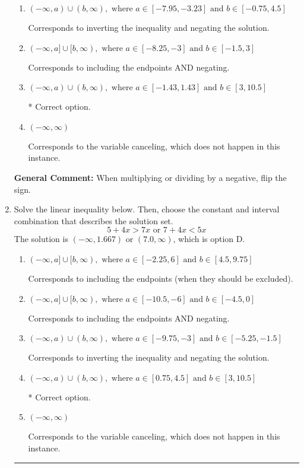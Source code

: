 \documentclass{extbook}[14pt]
\newcommand{\litem}[1]{\item #1

\rule{\textwidth}{0.4pt}}
\begin{document}
\begin{enumerate}
{\begin{enumerate}[label=\Alph*.]
Corresponds to including the endpoints (when they should be excluded).
\item \( (-\infty, a) \cup (b, \infty), \text{ where } a \in [-7.95, -3.23] \text{ and } b \in [-0.75, 4.5] \)

Corresponds to inverting the inequality and negating the solution.
\item \( (-\infty, a] \cup [b, \infty), \text{ where } a \in [-8.25, -3] \text{ and } b \in [-1.5, 3] \)

Corresponds to including the endpoints AND negating.
\item \( (-\infty, a) \cup (b, \infty), \text{ where } a \in [-1.43, 1.43] \text{ and } b \in [3, 10.5] \)

 * Correct option.
\item \( (-\infty, \infty) \)

Corresponds to the variable canceling, which does not happen in this instance.
\end{enumerate}

\textbf{General Comment:} When multiplying or dividing by a negative, flip the sign.
}
\litem{
Solve the linear inequality below. Then, choose the constant and interval combination that describes the solution set.
\[ 5 + 4 x > 7 x \text{ or } 7 + 4 x < 5 x \]The solution is \( (-\infty, 1.667) \text{ or } (7.0, \infty) \), which is option D.\begin{enumerate}[label=\Alph*.]
\item \( (-\infty, a] \cup [b, \infty), \text{ where } a \in [-2.25, 6] \text{ and } b \in [4.5, 9.75] \)

Corresponds to including the endpoints (when they should be excluded).
\item \( (-\infty, a] \cup [b, \infty), \text{ where } a \in [-10.5, -6] \text{ and } b \in [-4.5, 0] \)

Corresponds to including the endpoints AND negating.
\item \( (-\infty, a) \cup (b, \infty), \text{ where } a \in [-9.75, -3] \text{ and } b \in [-5.25, -1.5] \)

Corresponds to inverting the inequality and negating the solution.
\item \( (-\infty, a) \cup (b, \infty), \text{ where } a \in [0.75, 4.5] \text{ and } b \in [3, 10.5] \)

 * Correct option.
\item \( (-\infty, \infty) \)

Corresponds to the variable canceling, which does not happen in this instance.
\end{enumerate}

}
\end{enumerate}
\end{document}
